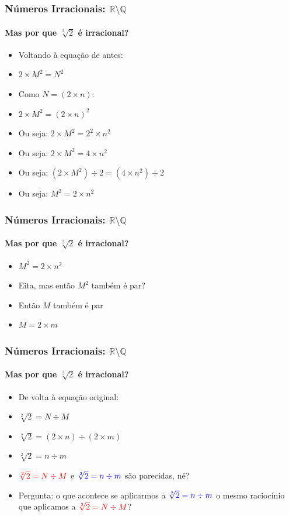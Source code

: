 \documentclass[usenames,dvipsnames,svgnames]{beamer}
\begin{document}
\begin{frame}	
	\frametitle{Números Irracionais: $\mathbb{R} \setminus \mathbb{Q}$}
	\framesubtitle{Mas {\color{red}por que} $\sqrt[2]{2}$ é irracional?}

	\begin{itemize}
		\item Voltando à equação de antes:
		\item $2 \times M^2 = N^2$
		\item Como $N = (2 \times n)$:
		\item $2 \times M^2 = (2 \times n)^2$
		\item Ou seja: $2 \times M^2 = 2^2 \times n^2$
		\item Ou seja: $2 \times M^2 = 4 \times n^2$
		\item Ou seja: $(2 \times M^2) \div 2 = (4 \times n^2) \div 2$
		\item Ou seja: $M^2 = 2 \times n^2$
	\end{itemize}
\end{frame}

\begin{frame}	
	\frametitle{Números Irracionais: $\mathbb{R} \setminus \mathbb{Q}$}
	\framesubtitle{Mas {\color{red}por que} $\sqrt[2]{2}$ é irracional?}

	\begin{itemize}
		\item $M^2 = 2 \times n^2$
		\item Eita, mas então $M^2$ também é par?
		\item Então $M$ também é par
		\item $M = 2 \times m$
	\end{itemize}
\end{frame}

\begin{frame}	
	\frametitle{Números Irracionais: $\mathbb{R} \setminus \mathbb{Q}$}
	\framesubtitle{Mas {\color{red}por que} $\sqrt[2]{2}$ é irracional?}

	\begin{itemize}
		\item De volta à equação original:
		\item $\sqrt[2]{2} = N \div M$
		\item $\sqrt[2]{2} = (2 \times n) \div (2 \times m)$
		\item $\sqrt[2]{2} = n \div m$
		\item ${\color{red}\sqrt[2]{2} = N \div M}$ e ${\color{blue}\sqrt[2]{2} = n \div m}$ são parecidas, né?
		\item Pergunta: o que acontece se aplicarmos a ${\color{blue}\sqrt[2]{2} = n \div m}$ o mesmo raciocínio que aplicamos a ${\color{red}\sqrt[2]{2} = N \div M}$?
	\end{itemize}
\end{frame}
\end{document}

